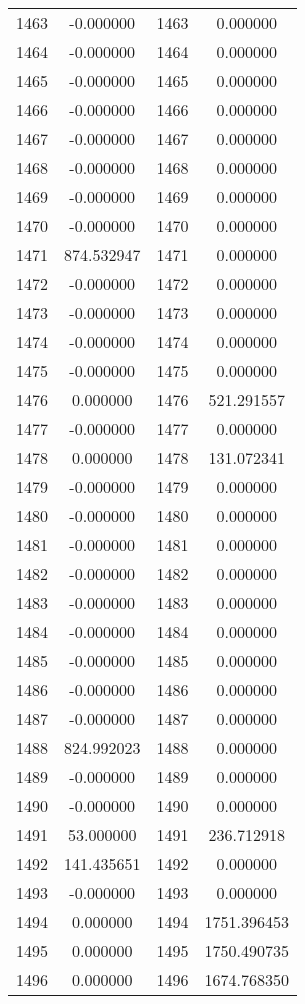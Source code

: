 \documentclass[12pt]{article}
\begin{document}
\begin{longtable}{@{}cccc@{}}
1463 & -0.000000 & 1463 & 0.000000 \\
1464 & -0.000000 & 1464 & 0.000000 \\
1465 & -0.000000 & 1465 & 0.000000 \\
1466 & -0.000000 & 1466 & 0.000000 \\
1467 & -0.000000 & 1467 & 0.000000 \\
1468 & -0.000000 & 1468 & 0.000000 \\
1469 & -0.000000 & 1469 & 0.000000 \\
1470 & -0.000000 & 1470 & 0.000000 \\
1471 & 874.532947 & 1471 & 0.000000 \\
1472 & -0.000000 & 1472 & 0.000000 \\
1473 & -0.000000 & 1473 & 0.000000 \\
1474 & -0.000000 & 1474 & 0.000000 \\
1475 & -0.000000 & 1475 & 0.000000 \\
1476 & 0.000000 & 1476 & 521.291557 \\
1477 & -0.000000 & 1477 & 0.000000 \\
1478 & 0.000000 & 1478 & 131.072341 \\
1479 & -0.000000 & 1479 & 0.000000 \\
1480 & -0.000000 & 1480 & 0.000000 \\
1481 & -0.000000 & 1481 & 0.000000 \\
1482 & -0.000000 & 1482 & 0.000000 \\
1483 & -0.000000 & 1483 & 0.000000 \\
1484 & -0.000000 & 1484 & 0.000000 \\
1485 & -0.000000 & 1485 & 0.000000 \\
1486 & -0.000000 & 1486 & 0.000000 \\
1487 & -0.000000 & 1487 & 0.000000 \\
1488 & 824.992023 & 1488 & 0.000000 \\
1489 & -0.000000 & 1489 & 0.000000 \\
1490 & -0.000000 & 1490 & 0.000000 \\
1491 & 53.000000 & 1491 & 236.712918 \\
1492 & 141.435651 & 1492 & 0.000000 \\
1493 & -0.000000 & 1493 & 0.000000 \\
1494 & 0.000000 & 1494 & 1751.396453 \\
1495 & 0.000000 & 1495 & 1750.490735 \\
1496 & 0.000000 & 1496 & 1674.768350 \\

\end{longtable}
\end{document}
